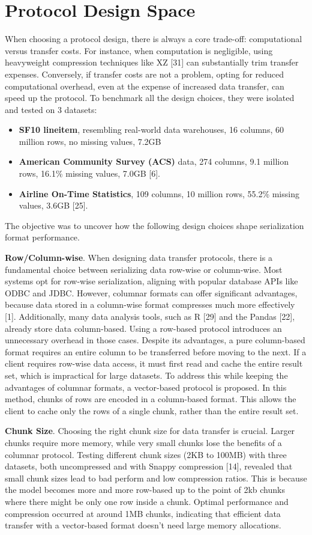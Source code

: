 \documentclass[sigconf]{acmart}
\begin{document}
\section{Protocol Design Space}
When choosing a protocol design, there is always a core trade-off: computational versus transfer costs. For instance, when computation is negligible, using heavyweight compression techniques like XZ [31] can substantially trim transfer expenses. Conversely, if transfer costs are not a problem, opting for reduced computational overhead, even at the expense of increased data transfer, can speed up the protocol.
To benchmark all the design choices, they were isolated and tested on 3 datasets:
\begin{itemize}
  \item \textbf{SF10 lineitem}, resembling real-world data warehouses, 16 columns, 60 million rows, no missing values, 7.2GB
  \item \textbf{American Community Survey (ACS)} data, 274 columns, 9.1 million rows, 16.1\% missing values, 7.0GB [6].
  \item \textbf{Airline On-Time Statistics}, 109 columns, 10 million rows, 55.2\% missing values, 3.6GB [25].
\end{itemize}
The objective was to uncover how the following design choices shape serialization format performance.

\textbf{Row/Column-wise}. 
When designing data transfer protocols, there is a fundamental choice between serializing data row-wise or column-wise. Most systems opt for row-wise serialization, aligning with popular database APIs like ODBC and JDBC. However, columnar formats can offer significant advantages, because data stored in a column-wise format compresses much more effectively [1]. Additionally, many data analysis tools, such as R [29] and the Pandas [22], already store data column-based. Using a row-based protocol introduces an unnecessary overhead in those cases.
Despite its advantages, a pure column-based format requires an entire column to be transferred before moving to the next. If a client requires row-wise data access, it must first read and cache the entire result set, which is impractical for large datasets.
To address this while keeping the advantages of columnar formats, a vector-based protocol is proposed. In this method, chunks of rows are encoded in a column-based format. This allows the client to cache only the rows of a single chunk, rather than the entire result set.

\textbf{Chunk Size}.
Choosing the right chunk size for data transfer is crucial. Larger chunks require more memory, while very small chunks lose the benefits of a columnar protocol. Testing different chunk sizes (2KB to 100MB) with three datasets, both uncompressed and with Snappy compression [14], revealed that small chunk sizes lead to bad perform and low compression ratios. This is because the model becomes more and more row-based up to the point of 2kb chunks where there might be only one row inside a chunk. Optimal performance and compression occurred at around 1MB chunks, indicating that efficient data transfer with a vector-based format doesn't need large memory allocations.
\end{document}
